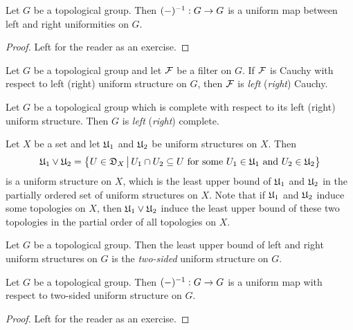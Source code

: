 \documentclass[10pt]{amsart}
\begin{document}
\begin{fact}\label{fact:inverse_is_an_isomorphism_of_left_and_right_uniform_structures}
	Let $G$ be a topological group. Then $(-)^{-1}:G\rightarrow G$ is a uniform map between left and right uniformities on $G$.
\end{fact}
\begin{proof}
	Left for the reader as an exercise.
\end{proof}

\begin{definition}
	Let $G$ be a topological group and let ${\mathcal F}$ be a filter on $G$. If ${\mathcal F}$ is Cauchy with respect to left (right) uniform structure on $G$, then ${\mathcal F}$ is \textit{left} (\textit{right}) Cauchy.
\end{definition}

\begin{definition}
	Let $G$ be a topological group which is complete with respect to its left (right) uniform structure. Then $G$ is \textit{left} (\textit{right}) complete.
\end{definition}

\begin{remark}\label{remark:join_of_uniform_structures}
	Let $X$ be a set and let ${\mathfrak U}_1$ and ${\mathfrak U}_2$ be uniform structures on $X$. Then
	$${\mathfrak U}_1\vee {\mathfrak U}_2 = \big\{U \in {\mathfrak D}_X\,\big|\,U_1\cap U_2\subseteq U\mbox{ for some }U_1\in {\mathfrak U}_1\mbox{ and }U_2\in {\mathfrak U}_2\big\}$$
	is a uniform structure on $X$, which is the least upper bound of ${\mathfrak U}_1$ and ${\mathfrak U}_2$ in the partially ordered set of uniform structures on $X$. Note that if ${\mathfrak U}_1$ and ${\mathfrak U}_2$ induce some topologies on $X$, then ${\mathfrak U}_1\vee {\mathfrak U}_2$ induce the least upper bound of these two topologies in the partial order of all topologies on $X$.
\end{remark}

\begin{definition}
	Let $G$ be a topological group. Then the least upper bound of left and right uniform structures on $G$ is the \textit{two-sided} uniform structure on $G$.
\end{definition}

\begin{fact}\label{fact:inverse_is_an_automorphism_of_two_sided_uniform_structures}
	Let $G$ be a topological group. Then $(-)^{-1}:G\rightarrow G$ is a uniform map with respect to two-sided uniform structure on $G$.
\end{fact}
\begin{proof}
	Left for the reader as an exercise.
\end{proof}
\end{document}
